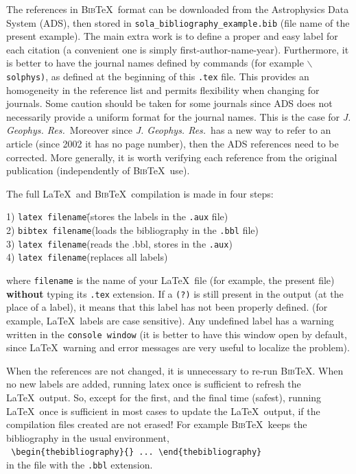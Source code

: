 \documentclass[namedreferences]{solarphysics}
\newcommand{\BibTeX}{\textsc{Bib}\TeX}
\newcommand{\jgr}{    {\it J. Geophys. Res.}}
\begin{document}
\begin{article}
  The references in \BibTeX\ format can be downloaded from the 
Astrophysics Data System (ADS), then stored
in \verb+sola_bibliography_example.bib+  (file name of the present example).
The main extra work is to define a proper and easy label for each citation
(a convenient one is simply first-author-name-year).  Furthermore, it is better
to have the journal names defined by commands (for example 
\texttt{$\backslash$solphys)}, as defined at the beginning of 
this \texttt{.tex} file.
This provides an homogeneity in the reference list and permits flexibility
when changing for journals.   Some caution should be taken for some journals
since ADS does not necessarily provide a uniform format for the
journal names. This is the case for \jgr\  Moreover since
\jgr\ has a new way to refer to an article 
(since 2002 it has no page number), then the ADS references need to be corrected. 
More generally, it is worth verifying
each reference from the original publication (independently of \BibTeX\ use).

   The full \LaTeX\ and \BibTeX\ compilation is made in four steps: 
\begin{tabbing}
1) {\tt latex filename}\qquad\qquad\=(stores the labels in the {\tt .aux} file)\\
2) {\tt bibtex filename}\>(loads the bibliography in the {\tt .bbl} file)\\
3) {\tt latex filename}\>(reads the .bbl, stores in the {\tt .aux})\\
4) {\tt latex filename}\>(replaces all labels)  
\end{tabbing}
   where \texttt{filename} is the name of your \LaTeX\ file (for example, 
the present file) {\bf without} typing its \texttt{.tex} extension.
If a \texttt{(?)} is still present in the output (at the place of a label),
it means that this label has not been properly defined. 
 (for example, \LaTeX\ labels are case sensitive).
Any undefined label has a warning written in the \texttt{console window}
(it is better to have this window open by default, since \LaTeX\ warning and 
error messages are very useful to localize the problem).

  When the references are not changed, it is unnecessary to re-run \BibTeX .
When no new labels are added, running latex once is sufficient to refresh
the \LaTeX\ output. So, except for
the first, and the final time (safest), running \LaTeX\ once is sufficient
in most cases to update the \LaTeX\ output, if the compilation files 
created are not erased! For example \BibTeX\ keeps the bibliography in the usual 
environment,\\
  \verb+ \begin{thebibliography}{} ... \end{thebibliography}+\\
in the file with the \verb+.bbl+ extension.  


\end{article}
\end{document}
